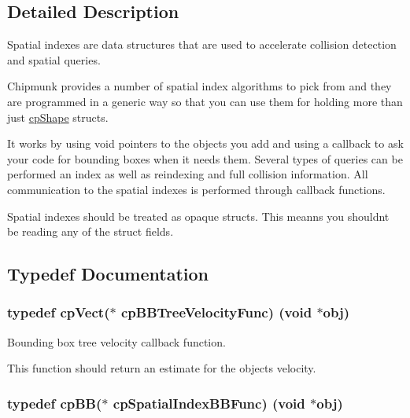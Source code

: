 \subsection{Detailed Description}
Spatial indexes are data structures that are used to accelerate collision detection and spatial queries. 

Chipmunk provides a number of spatial index algorithms to pick from and they are programmed in a generic way so that you can use them for holding more than just \hyperlink{structcp_shape}{cp\+Shape} structs.

It works by using {\ttfamily void} pointers to the objects you add and using a callback to ask your code for bounding boxes when it needs them. Several types of queries can be performed an index as well as reindexing and full collision information. All communication to the spatial indexes is performed through callback functions.

Spatial indexes should be treated as opaque structs. This meanns you shouldn\textquotesingle{}t be reading any of the struct fields. 

\subsection{Typedef Documentation}
\hypertarget{group__cp_spatial_index_ga5e805ddbe3cab9b92a6fbd933ff6e6b0}{}
\subsubsection[{cp\+B\+B\+Tree\+Velocity\+Func}]{\setlength{\rightskip}{0pt plus 5cm}typedef {\bf cp\+Vect}($\ast$ cp\+B\+B\+Tree\+Velocity\+Func) (void $\ast$obj)}\label{group__cp_spatial_index_ga5e805ddbe3cab9b92a6fbd933ff6e6b0}


Bounding box tree velocity callback function. 

This function should return an estimate for the object\textquotesingle{}s velocity. \hypertarget{group__cp_spatial_index_gaa8cf991cadcee1fbb6ee9379a0a6e0ea}{}
\subsubsection[{cp\+Spatial\+Index\+B\+B\+Func}]{\setlength{\rightskip}{0pt plus 5cm}typedef {\bf cp\+B\+B}($\ast$ cp\+Spatial\+Index\+B\+B\+Func) (void $\ast$obj)}\label{group__cp_spatial_index_gaa8cf991cadcee1fbb6ee9379a0a6e0ea}


